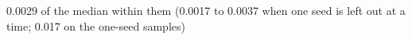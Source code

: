 0.0029 of the median within them (0.0017 to 0.0037 when one seed is left out at a time; 0.017 on the one-seed samples)